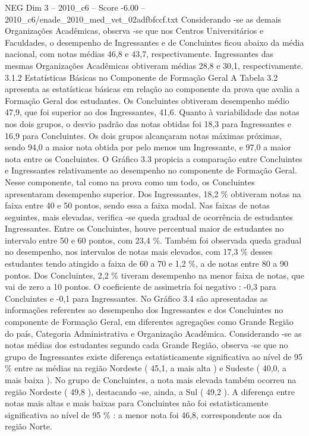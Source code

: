 \begin{textsample}{NEG Dim 3 – 2010\_c6 – Score -6.00 – 2010\_c6/enade\_2010\_med\_vet\_02adfbfccf.txt}
Considerando -se as demais Organizações Acadêmicas, observa -se que nos Centros Universitários e Faculdades, o desempenho de Ingressantes e de Concluintes ficou abaixo da média nacional, com notas médias 46,8 e 43,7, respectivamente.
Ingressantes das mesmas Organizações Acadêmicas obtiveram médias 28,8 e 30,1, respectivamente. 3.1.2 Estatísticas Básicas no Componente de Formação Geral A Tabela 3.2 apresenta as estatísticas básicas em relação ao componente da prova que avalia a Formação Geral dos estudantes.
Os Concluintes obtiveram desempenho médio 47,9, que foi superior ao dos Ingressantes, 41,6.
Quanto à variabilidade das notas nos dois grupos, o desvio padrão das notas obtidas foi 18,3 para Ingressantes e 16,9 para Concluintes.
Os dois grupos alcançaram notas máximas próximas, sendo 94,0 a maior nota obtida por pelo menos um Ingressante, e 97,0 a maior nota entre os Concluintes.
O Gráfico 3.3 propicia a comparação entre Concluintes e Ingressantes relativamente ao desempenho no componente de Formação Geral.
Nesse componente, tal como na prova como um todo, os Concluintes apresentaram desempenho superior.
Dos Ingressantes, 18,2 \% obtiveram notas na faixa entre 40 e 50 pontos, sendo essa a faixa modal.
Nas faixas de notas seguintes, mais elevadas, verifica -se queda gradual de ocorrência de estudantes Ingressantes.
Entre os Concluintes, houve percentual maior de estudantes no intervalo entre 50 e 60 pontos, com 23,4 \%.
Também foi observada queda gradual no desempenho, nos intervalos de notas mais elevados, com 17,3 \% desses estudantes tendo atingido a faixa de 60 a 70 e 1,2 \%, a de notas entre 80 a 90 pontos.
Dos Concluintes, 2,2 \% tiveram desempenho na menor faixa de notas, que vai de zero a 10 pontos.
O coeficiente de assimetria foi negativo : -0,3 para Concluintes e -0,1 para Ingressantes.
No Gráfico 3.4 são apresentadas as informações referentes ao desempenho dos Ingressantes e dos Concluintes no componente de Formação Geral, em diferentes agregações como Grande Região do país, Categoria Administrativa e Organização Acadêmica.
Considerando -se as notas médias dos estudantes segundo cada Grande Região, observa -se que no grupo de Ingressantes existe diferença estatisticamente significativa ao nível de 95 \% entre as médias na região Nordeste ( 45,1, a mais alta ) e Sudeste ( 40,0, a mais baixa ).
No grupo de Concluintes, a nota mais elevada também ocorreu na região Nordeste ( 49,8 ), destacando -se, ainda, a Sul ( 49,2 ).
A diferença entre notas mais altas e mais baixas para Concluintes não foi estatisticamente significativa ao nível de 95 \% : a menor nota foi 46,8, correspondente aos da região Norte.

\end{textsample}
